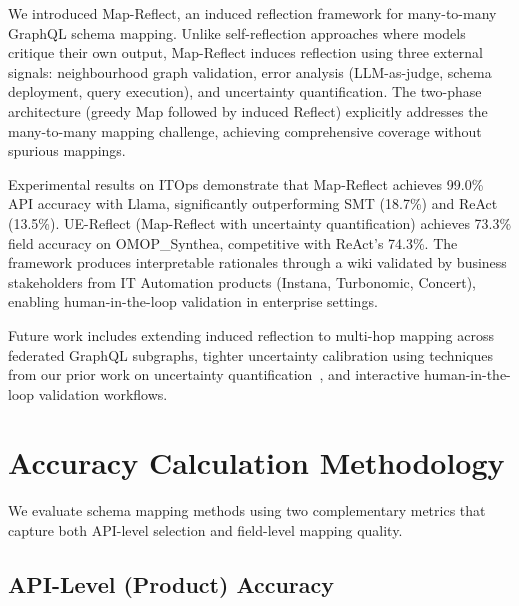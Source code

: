 \documentclass[sigconf, nonacm]{acmart}
\begin{document}
We introduced Map-Reflect, an induced reflection framework for many-to-many GraphQL schema mapping. Unlike self-reflection approaches where models critique their own output, Map-Reflect induces reflection using three external signals: neighbourhood graph validation, error analysis (LLM-as-judge, schema deployment, query execution), and uncertainty quantification. The two-phase architecture (greedy Map followed by induced Reflect) explicitly addresses the many-to-many mapping challenge, achieving comprehensive coverage without spurious mappings.

Experimental results on ITOps demonstrate that Map-Reflect achieves 99.0\% API accuracy with Llama, significantly outperforming SMT (18.7\%) and ReAct (13.5\%). UE-Reflect (Map-Reflect with uncertainty quantification) achieves 73.3\% field accuracy on OMOP\_Synthea, competitive with ReAct's 74.3\%. The framework produces interpretable rationales through a wiki validated by business stakeholders from IT Automation products (Instana, Turbonomic, Concert), enabling human-in-the-loop validation in enterprise settings.

Future work includes extending induced reflection to multi-hop mapping across federated GraphQL subgraphs, tighter uncertainty calibration using techniques from our prior work on uncertainty quantification~\cite{simba_uq,consistency_hypothesis}, and interactive human-in-the-loop validation workflows.


\clearpage

\appendix

\section{Accuracy Calculation Methodology}
\label{app:accuracy}

We evaluate schema mapping methods using two complementary metrics that capture both API-level selection and field-level mapping quality.

\subsection{API-Level (Product) Accuracy}
\end{document}
